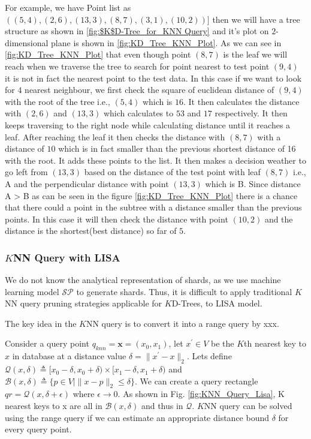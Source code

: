 \begin{mscexample}
	For example, we have Point list as $((5,4),(2,6),(13,3),(8,7),(3,1),(10,2))]$ then we will have a tree structure as shown in \ref{fig:$K$D-Tree_for_KNN Query} and it's plot on $2$-dimensional plane is shown in \ref{fig:KD_Tree_KNN_Plot}. As we can see in \ref{fig:KD_Tree_KNN_Plot} that even though point $(8,7)$ is the leaf we will reach when we traverse the tree to search for point nearest to test point $(9,4)$ it is not in fact the nearest point to the test data. In this case if we want to look for $4$ nearest neighbour, we first check the square of euclidean distance of $(9,4)$ with the root of the tree i.e., $(5,4)$ which is $16$. It then calculates the distance with $(2,6)$ and $(13,3)$ which calculates to $53$ and $17$ respectively. It then keeps traversing to the right node while calculating distance until it reaches a leaf. After reaching the leaf it then checks the distance with $(8,7)$ with a distance of $10$ which is in fact smaller than the previous shortest distance of 16 with the root. It adds these points to the list. It then makes a decision weather to go left from $(13,3)$ based on the distance of the test point with leaf $(8,7)$ i.e., A and the perpendicular distance with point $(13,3)$ which is B. Since distance A > B as can be seen in the figure \ref{fig:KD_Tree_KNN_Plot} there is a chance that there could a point in the subtree with a distance smaller than the previous points. In this case it will then check the distance with point $(10,2)$ and the distance is the shortest(best distance) so far of $5$. 
\end{mscexample}



\subsubsection{$K$NN Query with LISA}
We do not know the analytical representation of shards, as we use machine learning model $ \mathcal{SP}$ to generate shards. Thus, it is difficult to apply traditional $K$NN query pruning strategies applicable for $K$D-Trees, to LISA model. 

The key idea in the $K$NN query is to convert it into a range query by xxx.

Consider a query point $q_{knn}=\boldsymbol{x}=(x_{0},x_{1})$, let $x^{'} \in V$ be the $K$th nearest key to $x$ in database at a distance value $\delta = \| x^{'}-x\|_{2} $. Lets define $ \mathcal{Q}(x,\delta) \triangleq [x_{0}-\delta, x_{0}+\delta) \times[x_{1}-\delta, x_{1}+\delta)$ and $\mathcal{B}(x, \delta)  \triangleq \{p \in V \mid \| x-p\|_{2} \leq \delta \} $. We can create a query rectangle $qr =  \mathcal{Q}(x, \delta + \epsilon)$ where $\epsilon \rightarrow 0$. As shown in Fig. \ref{fig:KNN_Query_Lisa}, K nearest keys to x are all in $\mathcal{B}(x, \delta)$ and thus in $\mathcal{Q}$. $K$NN query can be solved using the range query if we can estimate an appropriate distance bound $\delta$ for every query point.

